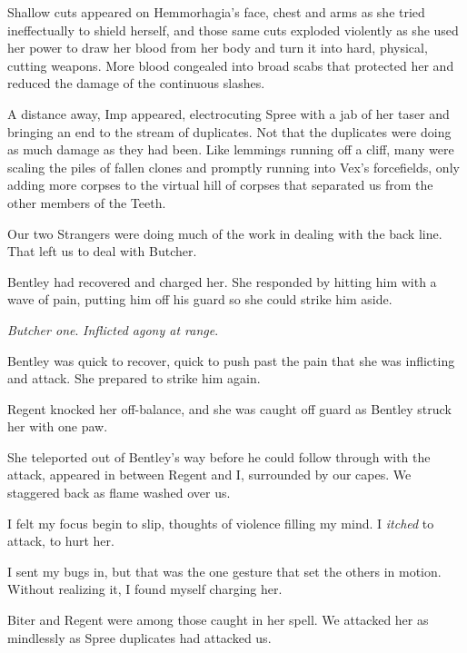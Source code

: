 Shallow cuts appeared on Hemmorhagia's face, chest and arms as she tried ineffectually to shield herself, and those same cuts exploded violently as she used her power to draw her blood from her body and turn it into hard, physical, cutting weapons.  More blood congealed into broad scabs that protected her and reduced the damage of the continuous slashes.



A distance away, Imp appeared, electrocuting Spree with a jab of her taser and bringing an end to the stream of duplicates.  Not that the duplicates were doing as much damage as they had been.  Like lemmings running off a cliff, many were scaling the piles of fallen clones and promptly running into Vex's forcefields, only adding more corpses to the virtual hill of corpses that separated us from the other members of the Teeth.



Our two Strangers were doing much of the work in dealing with the back line.  That left us to deal with Butcher.



Bentley had recovered and charged her.  She responded by hitting him with a wave of pain, putting him off his guard so she could strike him aside.



\emph{Butcher one}.  \emph{Inflicted agony at range}.



Bentley was quick to recover, quick to push past the pain that she was inflicting and attack.  She prepared to strike him again.



Regent knocked her off-balance, and she was caught off guard as Bentley struck her with one paw.



She teleported out of Bentley's way before he could follow through with the attack, appeared in between Regent and I, surrounded by our capes.  We staggered back as flame washed over us.



I felt my focus begin to slip, thoughts of violence filling my mind.  I \emph{itched} to attack, to hurt her.



I sent my bugs in, but that was the one gesture that set the others in motion.  Without realizing it, I found myself charging her.



Biter and Regent were among those caught in her spell.  We attacked her as mindlessly as Spree duplicates had attacked us.



